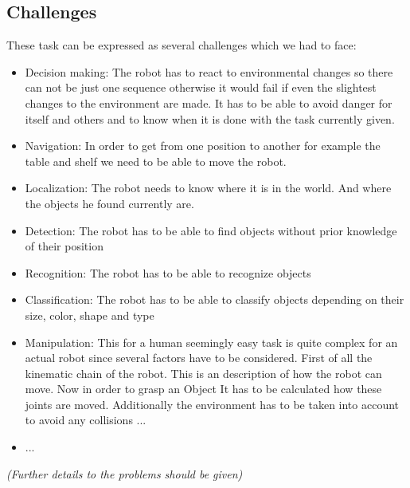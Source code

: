 \documentclass[main.tex]{subfiles}
\begin{document}
	\subsection{Challenges} 
	These task can be expressed as several challenges which we had to face:
	\begin{itemize}
		\item Decision making: The robot has to react to environmental changes so there can not be just one sequence otherwise it would fail if even the slightest changes to the environment are made. It has to be able to avoid danger for itself and others and to know when it is done with the task currently given.
		\item Navigation: In order to get from one position to another for example the table and shelf we need to be able to move the robot. 
		\item Localization: The robot needs to know where it is in the world. And where the objects he found currently are.
		\item Detection: The robot has to be able to find objects without prior knowledge of their position
		\item Recognition: The robot has to be able to recognize objects
		\item Classification: The robot has to be able to classify objects depending on their size, color, shape and type
		\item Manipulation: This for a human seemingly easy task is quite complex for an actual robot since several factors have to be considered. First of all the kinematic chain of the robot. This is an description of how the robot can move. Now in order to grasp an Object It has to be calculated how these joints are moved. Additionally the environment has to be taken into account to avoid any collisions ...
		\item ...

	\end{itemize}
	
	\textit{(Further details to the problems should be given)}	
	
\end{document}
